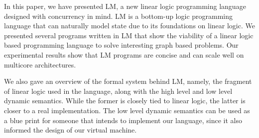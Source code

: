 In this paper, we have presented LM, a new linear logic programming language designed with concurrency in mind. LM is a bottom-up logic programming language
that can naturally model state due to its foundations on linear logic.
We presented several programs written in LM that show the viability of a linear logic based programming language to solve interesting graph based problems. Our experimental
results show that LM programs are concise and can scale well on multicore architectures.

We also gave an overview of the formal system behind LM, namely, the fragment of linear logic used in the language, along with the high level and low level dynamic semantics.
While the former is closely tied to linear logic, the latter is closer to a real implementation. The low level dynamic semantics can be used as a blue print for someone that
intends to implement our language, since it also informed the design of our virtual machine.